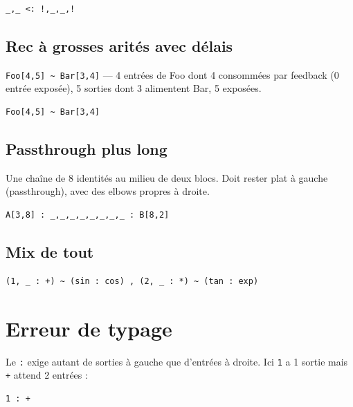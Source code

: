 \documentclass[11pt,a4paper]{article}
\theoremstyle{definition}
\begin{document}
\begin{lstlisting}
_,_ <: !,_,_,!
\end{lstlisting}


\subsection{Rec à grosses arités avec délais}

\texttt{Foo[4,5] \textasciitilde{} Bar[3,4]} — 4 entrées de Foo dont 4 consommées par feedback
(0 entrée exposée), 5 sorties dont 3 alimentent Bar, 5 exposées.


\begin{lstlisting}
Foo[4,5] ~ Bar[3,4]
\end{lstlisting}


\subsection{Passthrough plus long}

Une chaîne de 8 identités au milieu de deux blocs. Doit rester plat à
gauche (passthrough), avec des elbows propres à droite.


\begin{lstlisting}
A[3,8] : _,_,_,_,_,_,_,_ : B[8,2]
\end{lstlisting}


\subsection{Mix de tout}

\begin{lstlisting}
(1, _ : +) ~ (sin : cos) , (2, _ : *) ~ (tan : exp)
\end{lstlisting}


\section{Erreur de typage}

Le \texttt{:} exige autant de sorties à gauche que d'entrées à droite. Ici
\texttt{1} a 1 sortie mais \texttt{+} attend 2 entrées :


\begin{lstlisting}
1 : +
\end{lstlisting}
\end{document}
